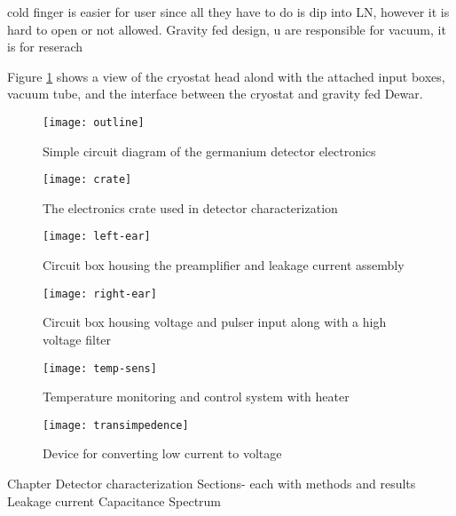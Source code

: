 cold finger is easier for user since all they have to do is dip into LN, however it is hard to open or not allowed.
Gravity fed design, u are responsible for vacuum, it is for reserach

Figure \ref{fig:outline} shows a view of the cryostat head alond with the attached input boxes, vacuum tube, and the interface between the cryostat and gravity fed Dewar.


\begin{figure}[htpb]
\centering
\texttt{[image: outline]}
\caption{Simple circuit diagram of the germanium detector electronics}
\label{fig:outline}
\end{figure}

\begin{figure}[htpb]
\centering
\texttt{[image: crate]}
\caption{The electronics crate used in detector characterization}
\label{fig:crate}
\end{figure}

\begin{figure}[htpb]
\centering
\texttt{[image: left-ear]}
\caption{Circuit box housing the preamplifier and leakage current assembly}
\label{fig:left-ear}
\end{figure}

\begin{figure}[htpb]
\centering
\texttt{[image: right-ear]}
\caption{Circuit box housing voltage and pulser input along with a high voltage filter}
\label{fig:right-ear}
\end{figure}

\begin{figure}[htpb]
\centering
\texttt{[image: temp-sens]}
\caption{Temperature monitoring and control system with heater}
\label{fig:temp-sens}
\end{figure}

\begin{figure}[htpb]
\centering
\texttt{[image: transimpedence]}
\caption{Device for converting low current to voltage}
\label{fig:transimpedence}
\end{figure}

Chapter Detector characterization
Sections- each with methods and results
Leakage current
Capacitance
Spectrum

